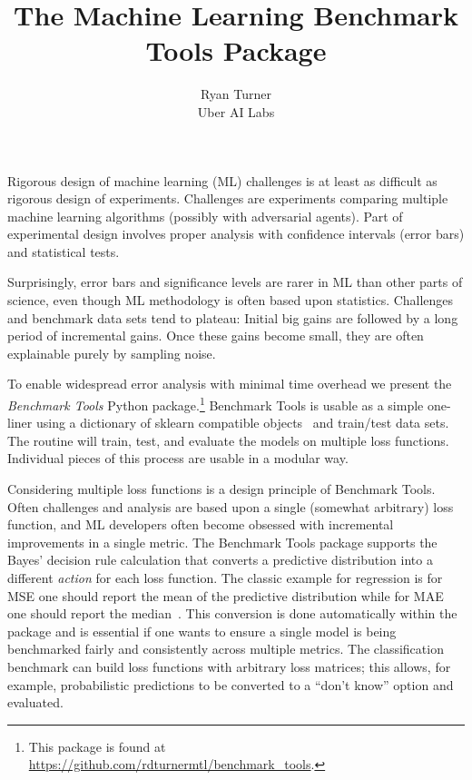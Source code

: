 \documentclass{article}
\title{The Machine Learning Benchmark Tools Package}
\author{
  Ryan Turner \\
  Uber AI Labs
}
\begin{document}

\maketitle

\vspace{-5mm}

Rigorous design of machine learning (ML) challenges is at least as difficult as rigorous design of experiments.
Challenges are experiments comparing multiple machine learning algorithms (possibly with adversarial agents)\@.
Part of experimental design involves proper analysis with confidence intervals (error bars) and statistical tests.

Surprisingly, error bars and significance levels are rarer in ML than other parts of science, even though ML methodology is often based upon statistics.
Challenges and benchmark data sets tend to plateau: Initial big gains are followed by a long period of incremental gains.
Once these gains become small, they are often explainable purely by sampling noise.

To enable widespread error analysis with minimal time overhead we present the \emph{Benchmark Tools} Python package.\footnote{This package is found at
\url{https://github.com/rdturnermtl/benchmark_tools}.}
Benchmark Tools is usable as a simple one-liner using a dictionary of sklearn compatible objects~\citep{Pedregosa2011} and train/test data sets.
The routine will train, test, and evaluate the models on multiple loss functions.
Individual pieces of this process are usable in a modular way.

Considering multiple loss functions is a design principle of Benchmark Tools.
Often challenges and analysis are based upon a single (somewhat arbitrary) loss function, and ML developers often become obsessed with incremental improvements in a single metric.
The Benchmark Tools package supports the Bayes' decision rule calculation that converts a predictive distribution into a different \emph{action} for each loss function.
The classic example for regression is for MSE one should report the mean of the predictive distribution while for MAE one should report the median~\citep{Marchini2013}.
This conversion is done automatically within the package and is essential if one wants to ensure a single model is being benchmarked fairly and consistently across multiple metrics.
The classification benchmark can build loss functions with arbitrary loss matrices; this allows, for example, probabilistic predictions to be converted to a ``don't know'' option and evaluated.
\end{document}
